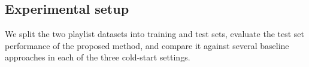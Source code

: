


\subsection{Experimental setup}

We split the two playlist datasets into training and test sets, %
evaluate the test set performance of the proposed method,
and compare it against
several baseline approaches
in each of the three cold-start settings.


